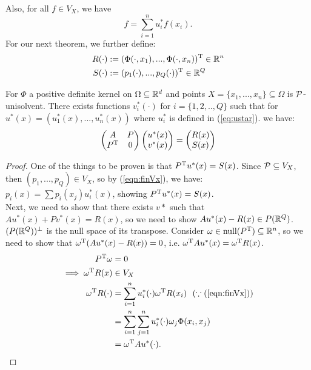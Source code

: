 \documentclass[twoside]{memoir}
\begin{document}
Also, for all $f \in V_X$, we have 
\begin{equation} \label{eqn:finVx}
f = \sum_{i=1}^{n} u_i^* f(x_i).
\end{equation}
For our next theorem, we further define:
\begin{equation}
\begin{split}
R(\cdot) &:= (\Phi(\cdot, x_1),..., \Phi(\cdot, x_n))^{\text{T}} \in \mathbb{R}^n\\
S(\cdot) &:= (p_1(\cdot),..., p_Q(\cdot))^{\text{T}} \in \mathbb{R}^Q \\
\end{split}
\end{equation}
\begin{thm}
	For $\Phi$ a positive definite kernel on $\Omega \subseteq \mathbb{R}^d$ and points $X = \{ x_1,..., x_n \} \subseteq \Omega$ is $\mathcal{P}$-unisolvent. There exists functions $v_i^*(\cdot)$ for $i = \{ 1, 2, .., Q \} $ such that for $u^*(x) = (u^*_1(x), ..., u^*_n(x))$ where $u^*_i$ is defined in (\ref{eq:ustar}). we have:
	\begin{equation} \label{eqn:vstar}
	\begin{pmatrix}
	A & P \\
	P^{\text{T}} & 0 \\
	\end{pmatrix}
	\begin{pmatrix}
	u^*(x)\\ v^*(x)
	\end{pmatrix}
	=
	\begin{pmatrix}
	R(x)\\ S(x)
	\end{pmatrix}
	\end{equation}
\end{thm}
\begin{proof}
	One of the things to be proven is that $P^{\text{T}} u^*(x) = S(x)$. Since $\mathcal{P} \subseteq V_X$, then $(p_1,..., p_Q) \in V_X$, so by (\ref{eqn:finVx}), we have: $p_i(x) = \sum p_i(x_j)u_i^*(x)$, showing $P^{\text{T}} u^*(x) = S(x)$.\\
	Next, we need to show that there exists $v*$ such that $Au^*(x) + Pv^*(x) = R(x)$, so we need to show $Au^*(x) - R(x) \in P(\mathbb{R}^Q)$.\\
	$(P(\mathbb{R}^Q))^\perp$ is the null space of its transpose. Consider $\omega \in \text{null}(P^{\text{T}}) \subseteq \mathbb{R}^n$, so we need to show that $\omega^{\text{T}} (Au^*(x) - R(x)) = 0$, i.e. $\omega^{\text{T}} Au^*(x) = \omega^{\text{T}} R(x)$.\\
	\begin{equation*}
	\begin{split}
	P^{\text{T}} \omega &= 0\\
	\implies \omega^{\text{T}} R(x) &\in V_X\\
	\omega^{\text{T}} R(\cdot) &= \sum_{i=1}^{n}u_i^*(\cdot)\omega^{\text{T}} R(x_i) ~~(\because (\ref{eqn:finVx}))\\
	&= \sum_{i=1}^{n} \sum_{j=1}^{n} u_i^*(\cdot) \omega_j \Phi(x_i, x_j) \\
	&= \omega^{\text{T}} A u^*(\cdot).\\
	\end{split}
	\end{equation*}
\end{proof}
\end{document}

